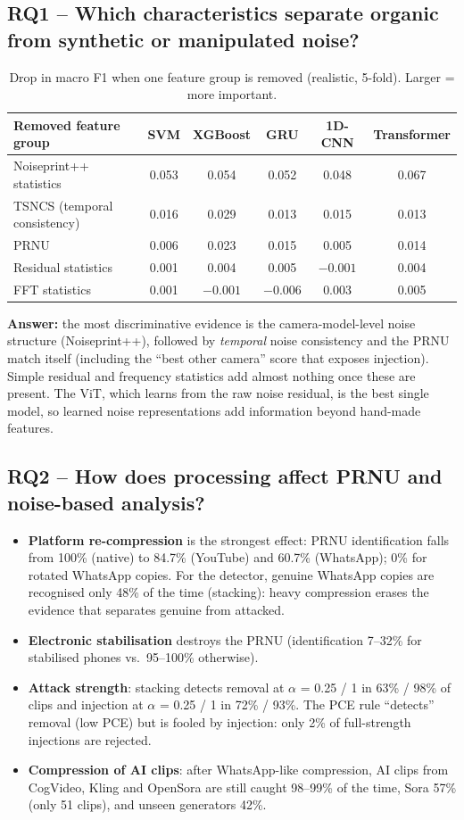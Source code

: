 \documentclass[11pt,a4paper]{article}
\begin{document}
\subsection{RQ1 -- Which characteristics separate organic from synthetic or manipulated noise?}\label{sec:rq1}
\begin{table}[H]\centering\small
\begin{tabular}{lccccc}\toprule
Removed feature group & SVM & XGBoost & GRU & 1D-CNN & Transformer \\\midrule
Noiseprint++ statistics & 0.053 & 0.054 & 0.052 & 0.048 & 0.067 \\
TSNCS (temporal consistency) & 0.016 & 0.029 & 0.013 & 0.015 & 0.013 \\
PRNU & 0.006 & 0.023 & 0.015 & 0.005 & 0.014 \\
Residual statistics & 0.001 & 0.004 & 0.005 & $-0.001$ & 0.004 \\
FFT statistics & 0.001 & $-0.001$ & $-0.006$ & 0.003 & 0.005 \\\bottomrule
\end{tabular}\caption{Drop in macro F1 when one feature group is removed (realistic, 5-fold). Larger = more important.}\end{table}
\textbf{Answer:} the most discriminative evidence is the camera-model-level noise structure (Noiseprint++), followed by
\emph{temporal} noise consistency and the PRNU match itself (including the ``best other camera'' score that exposes
injection). Simple residual and frequency statistics add almost nothing once these are present. The ViT, which learns from the
raw noise residual, is the best single model, so learned noise representations add information beyond hand-made features.

\subsection{RQ2 -- How does processing affect PRNU and noise-based analysis?}\label{sec:rq2}
\begin{itemize}
\item \textbf{Platform re-compression} is the strongest effect: PRNU identification falls from 100\% (native) to 84.7\%
      (YouTube) and 60.7\% (WhatsApp); 0\% for rotated WhatsApp copies. For the detector, genuine WhatsApp copies are
      recognised only 48\% of the time (stacking): heavy compression erases the evidence that separates genuine from attacked.
\item \textbf{Electronic stabilisation} destroys the PRNU (identification 7--32\% for stabilised phones vs.\ 95--100\% otherwise).
\item \textbf{Attack strength}: stacking detects removal at $\alpha$ = 0.25 / 1 in 63\% / 98\% of clips and injection at
      $\alpha$ = 0.25 / 1 in 72\% / 93\%. The PCE rule ``detects'' removal (low PCE) but is fooled by injection: only 2\% of
      full-strength injections are rejected.
\item \textbf{Compression of AI clips}: after WhatsApp-like compression, AI clips from CogVideo, Kling and OpenSora are still
      caught 98--99\% of the time, Sora 57\% (only 51 clips), and unseen generators 42\%.
\end{itemize}
\end{document}
